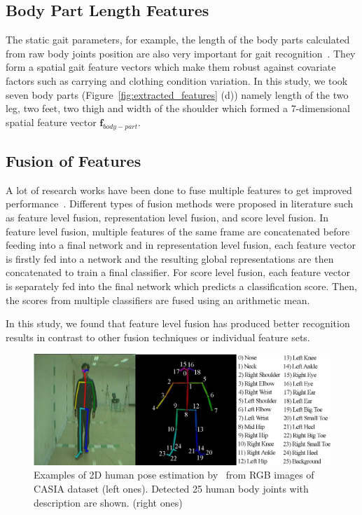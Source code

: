 \subsection{Body Part Length Features}
The static gait parameters, for example, the length of the body parts calculated from raw body joints position are also very important for gait recognition~\cite{Wang_04, Araujo_13}. They form a spatial gait feature vectors which make them robust against covariate factors such as carrying and clothing condition variation. In this study, we took seven body parts (Figure~\ref{fig:extracted_features} (d)) namely length of the two leg, two feet, two thigh and width of the shoulder which formed a 7-dimensional spatial feature vector $\textbf{f}_{body-part}$. 


\subsection{Fusion of Features}
A lot of research works have been done to fuse multiple features to get improved performance~\cite{Liao_19, Wang_04}.  Different types of fusion methods were proposed in literature such as feature level fusion, representation level fusion, and score level fusion. In feature level fusion, multiple features of the same frame are concatenated before feeding into a final network and in representation level fusion, each feature vector is firstly fed into a network and the resulting global representations are then concatenated to train a final classifier. For score level fusion, each feature vector is separately fed into the final network which predicts a classification score. Then, the scores from multiple classifiers are fused using an arithmetic mean.

In this study, we found that feature level fusion has produced better recognition results in contrast to other fusion techniques or individual feature sets. 


\begin{figure}
	\centering 
	\includegraphics[width = \textwidth]{figures/pose_estimation.eps}
	\caption[Examples of 2D human pose estimation from RGB images of CASIA dataset]
	{Examples of 2D human pose estimation by~\cite{Cao_19} from RGB images of CASIA dataset (left ones). Detected 25 human body joints with description are shown. (right ones) \label{fig:pose_estimation}
	}
\end{figure}



